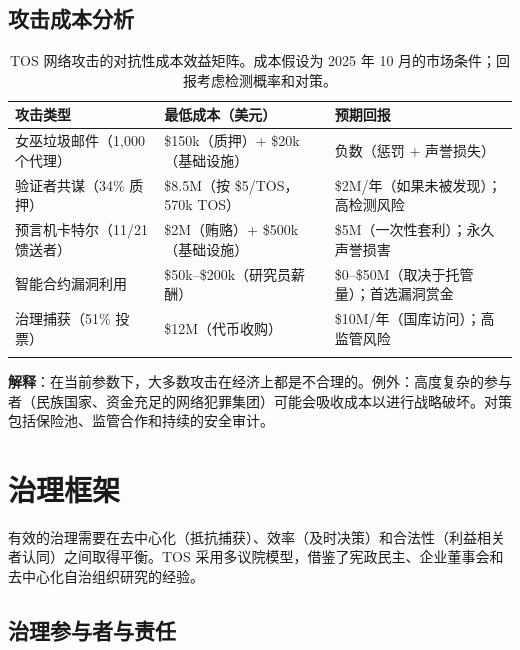 \documentclass[11pt]{article}
\begin{document}
\subsection{攻击成本分析}

\begin{longtable}{@{}p{}p{}p{}@{}}
\toprule
\textbf{攻击类型} & \textbf{最低成本（美元）} & \textbf{预期回报} \\\midrule
女巫垃圾邮件（1,000 个代理） & \$150k（质押）+ \$20k（基础设施） & 负数（惩罚 + 声誉损失） \\
验证者共谋（34\% 质押） & \$8.5M（按 \$5/TOS，570k TOS） & \$2M/年（如果未被发现）；高检测风险 \\
预言机卡特尔（11/21 馈送者） & \$2M（贿赂）+ \$500k（基础设施） & \$5M（一次性套利）；永久声誉损害 \\
智能合约漏洞利用 & \$50k--\$200k（研究员薪酬） & \$0--\$50M（取决于托管量）；首选漏洞赏金 \\
治理捕获（51\% 投票） & \$12M（代币收购） & \$10M/年（国库访问）；高监管风险 \\
\bottomrule
\caption{TOS 网络攻击的对抗性成本效益矩阵。成本假设为 2025 年 10 月的市场条件；回报考虑检测概率和对策。}
\end{longtable}

\textbf{解释}：在当前参数下，大多数攻击在经济上都是不合理的。例外：高度复杂的参与者（民族国家、资金充足的网络犯罪集团）可能会吸收成本以进行战略破坏。对策包括保险池、监管合作和持续的安全审计。

\section{治理框架}
\label{sec:governance}

有效的治理需要在去中心化（抵抗捕获）、效率（及时决策）和合法性（利益相关者认同）之间取得平衡。TOS 采用多议院模型，借鉴了宪政民主、企业董事会和去中心化自治组织研究的经验。

\subsection{治理参与者与责任}
\end{document}
